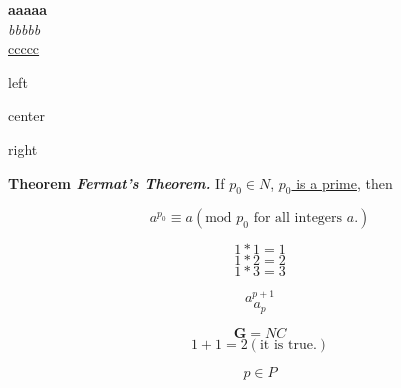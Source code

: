 \documentclass{article}
\begin{document}
\noindent
\textbf{aaaaa}\\
\textit{bbbbb}\\
\underline{ccccc}\\

\begin{flushleft}
left
\end{flushleft}

\begin{center}
center
\end{center}

\begin{flushright}
right
\end{flushright}

\textbf{Theorem \textit{Fermat's Theorem.}} If $p_0\in \mathit{N}$, \underline{$p_0$ is a prime}, then

$$a^{p_0}\equiv a(\mbox{mod }p_0\mbox{ for all integers }a.)$$

$$1*1=1$$
$$1*2=2$$
\[1*3=3\]

$$a^{p+1}$$
$$a_p$$

$$\mathbf{G} = \mathit{N} \mathit{C}$$
$$1+1=2(\mbox{it is true.})$$

$$\mathit{p}\in\mathit{P}$$
\end{document}

